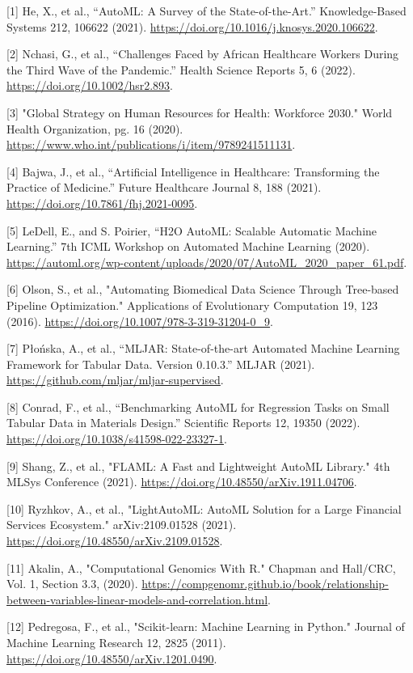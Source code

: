 \documentclass{article}
\begin{document}
\medskip
{
\small

[1] He, X., et al., “AutoML: A Survey of the State-of-the-Art.” Knowledge-Based Systems 212, 106622 (2021). \url{https://doi.org/10.1016/j.knosys.2020.106622}. 

[2] Nchasi, G., et al., “Challenges Faced by African Healthcare Workers During the Third Wave of the Pandemic.” Health Science Reports 5, 6 (2022). \url{https://doi.org/10.1002/hsr2.893}.

[3] "Global Strategy on Human Resources for Health: Workforce 2030." World Health Organization, pg. 16 (2020). \url{https://www.who.int/publications/i/item/9789241511131}.

[4] Bajwa, J., et al., “Artificial Intelligence in Healthcare: Transforming the Practice of Medicine.” Future Healthcare Journal 8, 188 (2021). \url{https://doi.org/10.7861/fhj.2021-0095}.

[5] LeDell, E., and S. Poirier, “H2O AutoML: Scalable Automatic Machine Learning.” 7th ICML Workshop on Automated Machine Learning (2020). \url{https://automl.org/wp-content/uploads/2020/07/AutoML_2020_paper_61.pdf}.

[6] Olson, S., et al., "Automating Biomedical Data Science Through Tree-based Pipeline Optimization." Applications of Evolutionary Computation 19, 123 (2016). \url{https://doi.org/10.1007/978-3-319-31204-0_9}.

[7] P\l{}o\'{n}ska, A., et al., “MLJAR: State-of-the-art Automated Machine Learning Framework for Tabular Data.  Version 0.10.3.” MLJAR (2021). \url{https://github.com/mljar/mljar-supervised}.

[8] Conrad, F., et al., “Benchmarking AutoML for Regression Tasks on Small Tabular Data in Materials Design.” Scientific Reports 12, 19350 (2022). \url{https://doi.org/10.1038/s41598-022-23327-1}.

[9] Shang, Z., et al., "FLAML: A Fast and Lightweight AutoML Library." 4th MLSys Conference (2021). \url{https://doi.org/10.48550/arXiv.1911.04706}.

[10] Ryzhkov, A., et al., "LightAutoML: AutoML Solution for a Large Financial Services Ecosystem." arXiv:2109.01528 (2021). \url{https://doi.org/10.48550/arXiv.2109.01528}.

[11] Akalin, A., "Computational Genomics With R." Chapman and Hall/CRC, Vol. 1, Section 3.3, (2020). \url{https://compgenomr.github.io/book/relationship-between-variables-linear-models-and-correlation.html}.

[12] Pedregosa, F., et al., "Scikit-learn: Machine Learning in Python." Journal of Machine Learning Research 12, 2825 (2011). \url{https://doi.org/10.48550/arXiv.1201.0490}.

}
\end{document}
